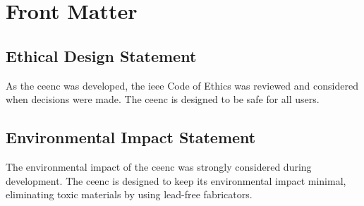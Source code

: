 \chapter{Front Matter}

\section{Ethical Design Statement}
As the \gls{ceenc} was developed, the \gls{ieee} Code of Ethics was reviewed and considered when decisions were made.
The \gls{ceenc} is designed to be safe for all users.

\section{Environmental Impact Statement}
The environmental impact of the \gls{ceenc} was strongly considered during development. 
The \gls{ceenc} is designed to keep its environmental impact minimal, eliminating toxic materials by using lead-free fabricators.


